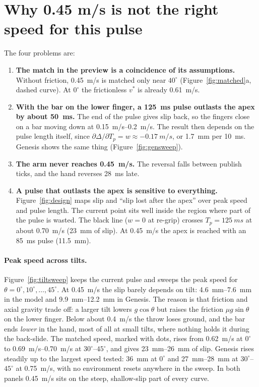 \documentclass[10.5pt,a4paper]{article}
\begin{document}
\section{Why 0.45 m/s is not the right speed for this pulse}
The four problems are:
\begin{enumerate}
\item \textbf{The match in the preview is a coincidence of its assumptions.} Without friction, \SI{0.45}{m/s} is
matched only near $40^\circ$ (Figure~\ref{fig:matched}a, dashed curve). At $0^\circ$ the frictionless $v^*$ is
already \SI{0.61}{m/s}.
\item \textbf{With the bar on the lower finger, a \SI{125}{ms} pulse outlasts the apex by about \SI{50}{ms}.} The
end of the pulse gives slip back, so the fingers close on a bar moving down at \SIrange{0.15}{0.2}{m/s}. The
result then depends on the pulse length itself, since $\partial\Delta/\partial T_p=w\approx\SI{-0.17}{m/s}$, or
\SI{1.7}{mm} per \SI{10}{ms}. Genesis shows the same thing (Figure~\ref{fig:gensweep}).
\item \textbf{The arm never reaches \SI{0.45}{m/s}.} The reversal falls between publish ticks, and the hand
reverses \SI{28}{ms} late.
\item \textbf{A pulse that outlasts the apex is sensitive to everything.} Figure~\ref{fig:design} maps slip and
``slip lost after the apex'' over peak speed and pulse length. The current point sits well inside the region
where part of the pulse is wasted. The black line ($w=0$ at re-grip) crosses $T_p=\SI{125}{ms}$ at about
\SI{0.70}{m/s} (\SI{23}{mm} of slip). At \SI{0.45}{m/s} the apex is reached with an \SI{85}{ms} pulse
(\SI{11.5}{mm}).
\end{enumerate}

\paragraph{Peak speed across tilts.} Figure~\ref{fig:tiltsweep} keeps the current pulse and sweeps the peak
speed for $\theta=0^\circ,10^\circ,\dots,45^\circ$. At \SI{0.45}{m/s} the slip barely depends on tilt:
\SIrange{4.6}{7.6}{mm} in the model and \SIrange{9.9}{12.2}{mm} in Genesis. The reason is that friction and
axial gravity trade off: a larger tilt lowers $g\cos\theta$ but raises the friction $\mu g\sin\theta$ on the
lower finger. Below about \SI{0.4}{m/s} the throw loses ground, and the bar ends \emph{lower} in the hand, most
of all at small tilts, where nothing holds it during the back-slide. The matched speed, marked with dots, rises
from \SI{0.62}{m/s} at $0^\circ$ to \SIrange{0.69}{0.70}{m/s} at $30^\circ$--$45^\circ$, and gives
\SIrange{23}{26}{mm} of slip. Genesis rises steadily up to the largest speed tested: \SI{36}{mm} at $0^\circ$
and \SIrange{27}{28}{mm} at $30^\circ$--$45^\circ$ at \SI{0.75}{m/s}, with no environment resets anywhere in
the sweep. In both panels \SI{0.45}{m/s} sits on the steep, shallow-slip part of every curve.
\end{document}
